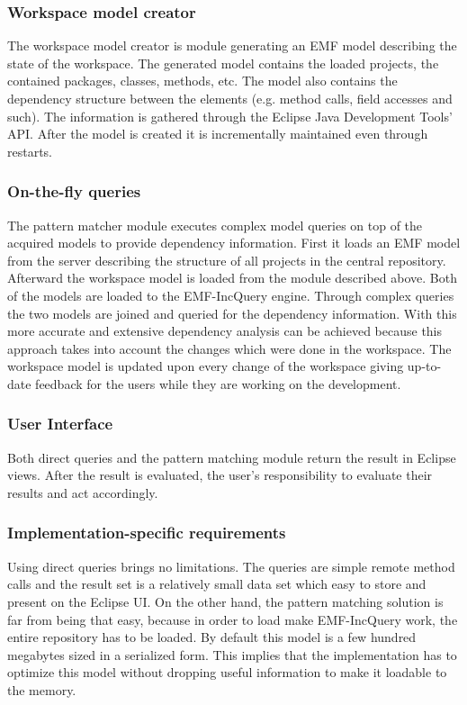 \subsubsection{Workspace model creator}
The workspace model creator is module generating an EMF model describing the
state of the workspace. The generated model contains the loaded projects, the
contained packages, classes, methods, etc. The model also contains the
dependency structure between the elements (e.g. method calls, field accesses and
such). The information is gathered through the Eclipse Java Development Tools'
API. After the model is created it is incrementally maintained even through 
restarts.

\subsubsection{On-the-fly queries}
The pattern matcher module executes complex model queries on top of the acquired
models to provide dependency information. First it loads an EMF model from the
server describing the structure of all projects in the central repository.
Afterward the workspace model is loaded from the module described above. Both of
the models are loaded to the EMF-IncQuery engine. Through complex queries the two
models are joined and queried for the dependency information. With this more 
accurate and extensive dependency analysis can be achieved because this approach
takes into account the changes which were done in the workspace. The workspace 
model is updated upon every change of the workspace giving up-to-date feedback 
for the users while they are working on the development. 

\subsubsection{User Interface}
Both direct queries and the pattern matching module return the result in Eclipse 
views. After the result is evaluated, the user's responsibility to evaluate their
results and act accordingly.

\subsubsection{Implementation-specific requirements}
Using direct queries brings no limitations. The queries are simple remote method
calls and the result set is a relatively small data set which easy to store and
present on the Eclipse UI. On the other hand, the pattern matching solution is
far from being that easy, because in order to load make EMF-IncQuery work, the
entire repository has to be loaded. By default this model is a few hundred
megabytes sized in a serialized form. This implies that the implementation has to 
optimize this model without dropping useful information to make it loadable to 
the memory.

